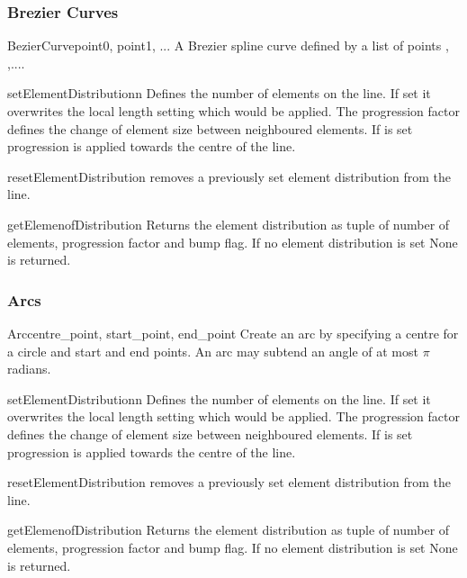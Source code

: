 \subsubsection{Brezier Curves}
\begin{classdesc}{BezierCurve}{point0, point1, ...}
A Brezier spline curve defined by a list of points , ,....
\end{classdesc}
\begin{methoddesc}[BezierCurve]{setElementDistribution}{n}
Defines the number of elements on the line. If set it overwrites the local length setting which would be applied. The progression factor  defines the change of element size between neighboured elements. If  is set
progression is applied towards the centre of the line.
\end{methoddesc}
\begin{methoddesc}[BezierCurve]{resetElementDistribution}{}
removes a previously set element distribution from the line.
\end{methoddesc}
\begin{methoddesc}[BezierCurve]{getElemenofDistribution}{}
Returns the element distribution as tuple of
number of elements, progression factor and bump flag. If
no element distribution is set None is returned.
\end{methoddesc}

\subsubsection{Arcs}
\begin{classdesc}{Arc}{centre_point, start_point, end_point}
Create an arc by specifying a centre for a circle and start and end points. An arc may subtend an angle of at most $\pi$ radians.
\end{classdesc}
\begin{methoddesc}[Arc]{setElementDistribution}{n}
Defines the number of elements on the line. If set it overwrites the local length setting which would be applied. The progression factor  defines the change of element size between neighboured elements. If  is set
progression is applied towards the centre of the line.
\end{methoddesc}
\begin{methoddesc}[Arc]{resetElementDistribution}{}
removes a previously set element distribution from the line.
\end{methoddesc}
\begin{methoddesc}[Arc]{getElemenofDistribution}{}
Returns the element distribution as tuple of
number of elements, progression factor and bump flag. If
no element distribution is set None is returned.
\end{methoddesc}



